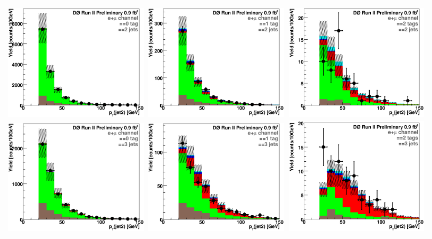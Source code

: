 \begin{figure}[!h!tbp]
\begin{center}
\includegraphics[width=0.32\textwidth]{eps/DataBackground/EMU/emu_EqZeroTag_EqTwoJet_Jet2Pt.eps}
\includegraphics[width=0.32\textwidth]{eps/DataBackground/EMU/emu_EqOneTag_EqTwoJet_Jet2Pt.eps}
\includegraphics[width=0.32\textwidth]{eps/DataBackground/EMU/emu_EqTwoTag_EqTwoJet_Jet2Pt.eps}
\includegraphics[width=0.32\textwidth]{eps/DataBackground/EMU/emu_EqZeroTag_EqThreeJet_Jet2Pt.eps}
\includegraphics[width=0.32\textwidth]{eps/DataBackground/EMU/emu_EqOneTag_EqThreeJet_Jet2Pt.eps}
\includegraphics[width=0.32\textwidth]{eps/DataBackground/EMU/emu_EqTwoTag_EqThreeJet_Jet2Pt.eps}

\end{center}
\end{figure}
